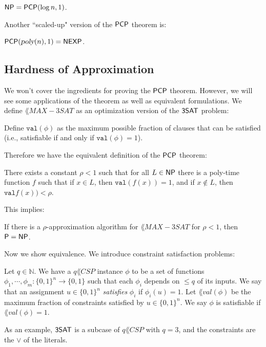 \begin{theorem}
\label{thm:1_pcp}
${\mathsf{NP}} = {\mathsf{PCP}}(\log n, 1)$.
\end{theorem}

Another ``scaled-up" version of the ${\mathsf{PCP}}$ theorem is:
\begin{theorem}
${\mathsf{PCP}}({\textsl{poly}}(n), 1) = {\mathsf{NEXP}}$.
\end{theorem}

\subsection{Hardness of Approximation}
\newcommand{\MAXThreeSAT}{\lang{MAX-3SAT}}
We won't cover the ingredients for proving the ${\mathsf{PCP}}$ theorem. However, we will see some applications of the theorem as well as equivalent formulations. We define $\MAXThreeSAT$ as an optimization version of the ${\mathsf{3SAT}}$ problem:

\begin{definition}
Define $\texttt{val}(\phi)$ as the maximum possible fraction of clauses that can be satisfied (i.e., satisfiable if and only if $\texttt{val}(\phi) = 1$).
\end{definition}

Therefore we have the equivalent definition of the ${\mathsf{PCP}}$ theorem:
\begin{theorem}
\label{thm:2_pcp}
There exists a constant $\rho < 1$ such that for all $L \in {\ensuremath{\mathsf{NP}}}$ there is a poly-time function $f$ such that if $x \in L$, then $\texttt{val}(f(x)) = 1$, and if $x \notin L$, then $\texttt{val}f(x)) < \rho$.
\end{theorem}

This implies:
\begin{corollary}
If there is a $\rho$-approximation algorithm for $\MAXThreeSAT$ for $\rho < 1$, then ${\mathsf{P}} = {\mathsf{NP}}$.
\end{corollary}

Now we show equivalence. We introduce constraint satisfaction problems:
\begin{definition}
Let $q \in \mathbb{N}$. We have a $q\lang{CSP}$ instance $\phi$ to be a set of functions $\phi_1, \cdots, \phi_m \colon \{0, 1\}^n \rightarrow \{0, 1\}$ such that each $\phi_i$ depends on $\le q$ of its inputs. We say that an assignment $u \in \{0, 1\}^n$ \emph{satisfies} $\phi_i$ if $\phi_i(u) = 1$. Let $\lang{val}(\phi)$ be the maximum fraction of constraints satisfied by $u \in \{0, 1\}^n$. We say $\phi$ is satisfiable if $\lang{val}(\phi) = 1$. 
\end{definition}
As an example, ${\mathsf{3SAT}}$ is a subcase of $q\lang{CSP}$ with $q = 3$, and the constraints are the $\vee$ of the literals. 

